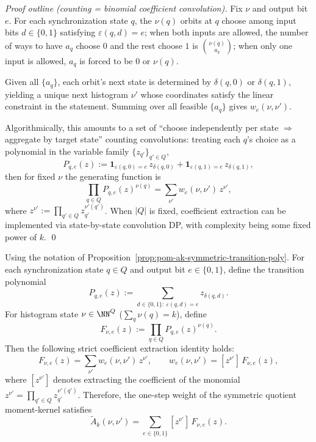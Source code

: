 \begin{proof}[Proof outline (counting = binomial coefficient convolution)]
Fix $\nu$ and output bit $e$. For each synchronization state $q$, the $\nu(q)$ orbits at $q$ choose among input bits $d\in\{0,1\}$ satisfying $\varepsilon(q,d)=e$; when both inputs are allowed, the number of ways to have $a_q$ choose $0$ and the rest choose $1$ is $\binom{\nu(q)}{a_q}$; when only one input is allowed, $a_q$ is forced to be $0$ or $\nu(q)$.

Given all $\{a_q\}$, each orbit's next state is determined by $\delta(q,0)$ or $\delta(q,1)$, yielding a unique next histogram $\nu'$ whose coordinates satisfy the linear constraint in the statement. Summing over all feasible $\{a_q\}$ gives $w_e(\nu,\nu')$.

Algorithmically, this amounts to a set of ``choose independently per state $\Rightarrow$ aggregate by target state'' counting convolutions: treating each $q$'s choice as a polynomial in the variable family $\{z_{q'}\}_{q'\in Q}$,
$$
P_{q,e}(z):=\mathbf{1}_{\varepsilon(q,0)=e}\,z_{\delta(q,0)}+\mathbf{1}_{\varepsilon(q,1)=e}\,z_{\delta(q,1)},
$$
then for fixed $\nu$ the generating function is
$$
\prod_{q\in Q} P_{q,e}(z)^{\nu(q)}
=\sum_{\nu'} w_e(\nu,\nu')\,z^{\nu'},
$$
where $z^{\nu'}:=\prod_{q'\in Q} z_{q'}^{\nu'(q')}$. When $|Q|$ is fixed, coefficient extraction can be implemented via state-by-state convolution DP, with complexity being some fixed power of $k$. \qed
\end{proof}

\begin{corollary}\label{cor:pom-ak-coefficient-extraction}
Using the notation of Proposition~\ref{prop:pom-ak-symmetric-transition-poly}.
For each synchronization state \(q\in Q\) and output bit \(e\in\{0,1\}\), define the transition polynomial
\[
P_{q,e}(z):=\sum_{d\in\{0,1\}:\ \varepsilon(q,d)=e} z_{\delta(q,d)}.
\]
For histogram state \(\nu\in\NN^Q\) (\(\sum_q\nu(q)=k\)), define
\[
F_{\nu,e}(z):=\prod_{q\in Q}P_{q,e}(z)^{\nu(q)}.
\]
Then the following strict coefficient extraction identity holds:
\[
F_{\nu,e}(z)=\sum_{\nu'} w_e(\nu,\nu')\,z^{\nu'},
\qquad
w_e(\nu,\nu')=[z^{\nu'}]\,F_{\nu,e}(z),
\]
where \([z^{\nu'}]\) denotes extracting the coefficient of the monomial \(z^{\nu'}=\prod_{q'\in Q} z_{q'}^{\nu'(q')}\).
Therefore, the one-step weight of the symmetric quotient moment-kernel satisfies
\[
\widetilde A_k(\nu,\nu')=\sum_{e\in\{0,1\}}[z^{\nu'}]\,F_{\nu,e}(z).
\]
\end{corollary}
